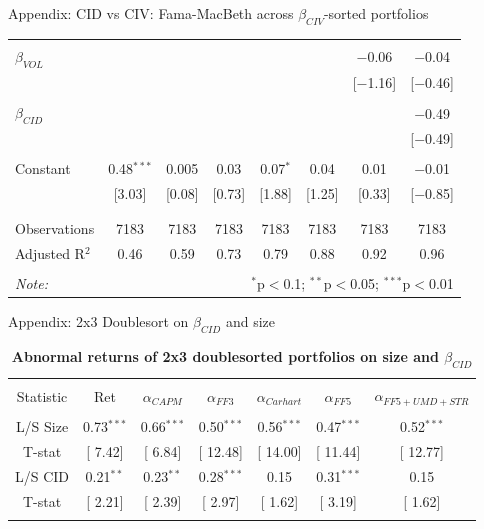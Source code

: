 \documentclass{beamer}
\begin{document}
{\begin{frame}{Appendix: CID vs CIV: Fama-MacBeth across $\beta_{CIV}$-sorted portfolios}
\begin{table}[!htbp]
\begin{tabular}{@{\extracolsep{-2pt}}lccccccc}
  & & & & & & & \\ 
 $\beta_{VOL}$ &  &  &  &  &  & $-$0.06 & $-$0.04 \\ 
  &  &  &  &  &  & [$-$1.16] & [$-$0.46] \\ 
  & & & & & & & \\ 
 $\beta_{CID}$ &  &  &  &  &  &  & $-$0.49 \\ 
  &  &  &  &  &  &  & [$-$0.49] \\ 
  & & & & & & & \\ 
 Constant & 0.48$^{***}$ & 0.005 & 0.03 & 0.07$^{*}$ & 0.04 & 0.01 & $-$0.01 \\ 
  & [3.03] & [0.08] & [0.73] & [1.88] & [1.25] & [0.33] & [$-$0.85] \\ 
  & & & & & & & \\ 
\hline \\[-1.8ex] 
Observations & 7183 & 7183 & 7183 & 7183 & 7183 & 7183 & 7183 \\ 
Adjusted R$^{2}$ & 0.46 & 0.59 & 0.73 & 0.79 & 0.88 & 0.92 & 0.96 \\ 
\hline 
\hline \\[-1.8ex] 
\textit{Note:}  & \multicolumn{7}{r}{$^{*}$p$<$0.1; $^{**}$p$<$0.05; $^{***}$p$<$0.01} \\ 
\end{tabular} 
\end{table}
\end{frame}
}



\begin{frame}{Appendix: 2x3 Doublesort on $\beta_{CID}$ and size}
\begin{table}[!htbp] \centering 
  \caption{\textbf{Abnormal returns of 2x3 doublesorted portfolios on size and $\beta_{CID}$}}
  \label{} 
\begin{tabular}{@{\extracolsep{5pt}} ccccccc} 
\\[-1.8ex]\hline 
\hline \\[-1.8ex] 
Statistic & Ret & $\alpha_{CAPM}$ & $\alpha_{FF3}$ & $\alpha_{Carhart}$ & $\alpha_{FF5}$ & $\alpha_{FF5+UMD+STR}$ \\ 
\hline \\[-1.8ex] 
L/S Size & 0.73$^{***}$ & 0.66$^{***}$ & 0.50$^{***}$ & 0.56$^{***}$ & 0.47$^{***}$ & 0.52$^{***}$ \\ 
T-stat & [ 7.42] & [ 6.84] & [ 12.48] & [ 14.00] & [ 11.44] & [ 12.77] \\ 
L/S CID & 0.21$^{**}$ & 0.23$^{**}$ & 0.28$^{***}$ & 0.15 & 0.31$^{***}$ & 0.15 \\ 
T-stat & [ 2.21] & [ 2.39] & [ 2.97] & [ 1.62] & [ 3.19] & [ 1.62] \\ 
\hline \\[-1.8ex] 
\end{tabular} 
\end{table}
\end{frame}
\end{document}
